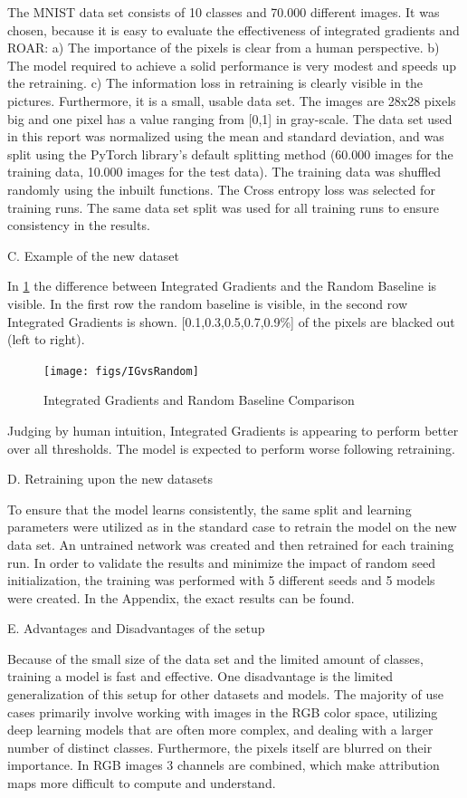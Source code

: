 The MNIST data set consists of 10 classes and 70.000 different images. It was chosen, because it is easy to evaluate the effectiveness of integrated gradients and ROAR: a) The importance of the pixels is clear from a human perspective. b) The model required to achieve a solid performance is very modest and speeds up the retraining. c) The information loss in retraining is clearly visible in the pictures. Furthermore, it is a small, usable data set. The images are 28x28 pixels big and one pixel has a value ranging from [0,1] in gray-scale. The data set used in this report was normalized using the mean and standard deviation, and was split using the PyTorch library’s default splitting method (60.000 images for the training data, 10.000 images for the test data). The training data was shuffled randomly using the inbuilt functions. The Cross entropy loss was selected for training runs. The same data set split was used for all training runs to ensure consistency in the results.

C. Example of the new dataset

In \ref{fig:IGvsRandom} the difference between Integrated Gradients and the Random Baseline is visible. In the first row the random baseline is visible, in the second row Integrated Gradients is shown. [0.1,0.3,0.5,0.7,0.9\%] of the pixels are blacked out (left to right).

\begin{figure}[h!]
	\centering
	\texttt{[image: figs/IGvsRandom]}
	\caption{Integrated Gradients and Random Baseline Comparison}
	\label{fig:IGvsRandom}
\end{figure}

Judging by human intuition, Integrated Gradients is appearing to perform better over all thresholds. The model is expected to perform worse following retraining.

D. Retraining upon the new datasets

To ensure that the model learns consistently, the same split and learning parameters were utilized as in the standard case to retrain the model on the new data set. An untrained network was created and then retrained for each training run. In order to validate the results and minimize the impact of random seed initialization, the training was performed with 5 different seeds and 5 models were created. In the Appendix, the exact results can be found.

E. Advantages and Disadvantages of the setup

Because of the small size of the data set and the limited amount of classes, training a model is fast and effective. One disadvantage is the limited generalization of this setup for other datasets and models. The majority of use cases primarily involve working with images in the RGB color space, utilizing deep learning models that are often more complex, and dealing with a larger number of distinct classes. Furthermore, the pixels itself are blurred on their importance. In RGB images 3 channels are combined, which make attribution maps more difficult to compute and understand.

